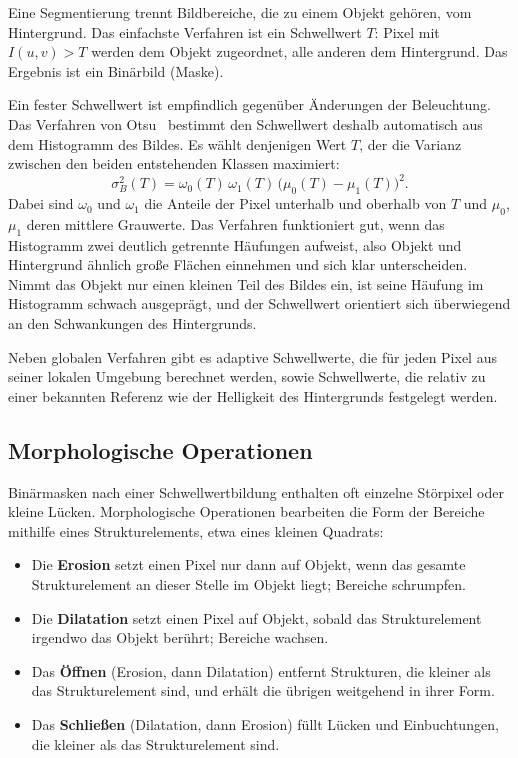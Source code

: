 Eine Segmentierung trennt Bildbereiche, die zu einem Objekt gehören, vom Hintergrund. Das
einfachste Verfahren ist ein Schwellwert $T$: Pixel mit $I(u, v) > T$ werden dem Objekt
zugeordnet, alle anderen dem Hintergrund. Das Ergebnis ist ein Binärbild (Maske).

Ein fester Schwellwert ist empfindlich gegenüber Änderungen der Beleuchtung. Das Verfahren
von Otsu~\cite{otsu1979} bestimmt den Schwellwert deshalb automatisch aus dem Histogramm des
Bildes. Es wählt denjenigen Wert $T$, der die Varianz zwischen den beiden entstehenden
Klassen maximiert:
\begin{equation}
  \sigma_B^2(T) = \omega_0(T)\,\omega_1(T)\,\bigl(\mu_0(T) - \mu_1(T)\bigr)^2 .
\end{equation}
Dabei sind $\omega_0$ und $\omega_1$ die Anteile der Pixel unterhalb und oberhalb von $T$
und $\mu_0$, $\mu_1$ deren mittlere Grauwerte. Das Verfahren funktioniert gut, wenn das
Histogramm zwei deutlich getrennte Häufungen aufweist, also Objekt und Hintergrund ähnlich
große Flächen einnehmen und sich klar unterscheiden. Nimmt das Objekt nur einen kleinen Teil
des Bildes ein, ist seine Häufung im Histogramm schwach ausgeprägt, und der Schwellwert
orientiert sich überwiegend an den Schwankungen des Hintergrunds.

Neben globalen Verfahren gibt es adaptive Schwellwerte, die für jeden Pixel aus seiner lokalen
Umgebung berechnet werden, sowie Schwellwerte, die relativ zu einer bekannten Referenz wie der
Helligkeit des Hintergrunds festgelegt werden.

\subsection{Morphologische Operationen}

Binärmasken nach einer Schwellwertbildung enthalten oft einzelne Störpixel oder kleine Lücken.
Morphologische Operationen bearbeiten die Form der Bereiche mithilfe eines
Strukturelements, etwa eines kleinen Quadrats:
\begin{itemize}
  \item Die \textbf{Erosion} setzt einen Pixel nur dann auf Objekt, wenn das gesamte
        Strukturelement an dieser Stelle im Objekt liegt; Bereiche schrumpfen.
  \item Die \textbf{Dilatation} setzt einen Pixel auf Objekt, sobald das Strukturelement
        irgendwo das Objekt berührt; Bereiche wachsen.
  \item Das \textbf{Öffnen} (Erosion, dann Dilatation) entfernt Strukturen, die kleiner als
        das Strukturelement sind, und erhält die übrigen weitgehend in ihrer Form.
  \item Das \textbf{Schließen} (Dilatation, dann Erosion) füllt Lücken und Einbuchtungen,
        die kleiner als das Strukturelement sind.
\end{itemize}

